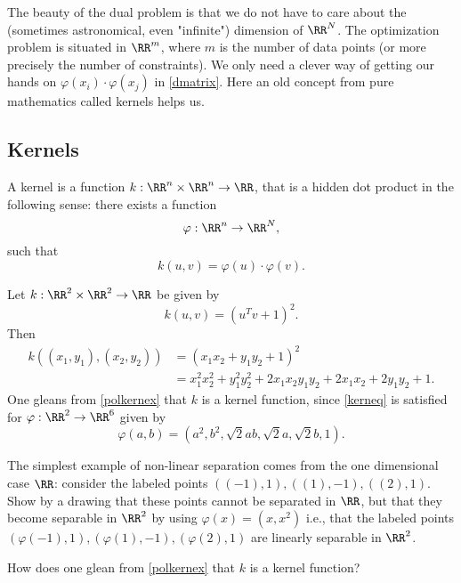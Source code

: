 \documentclass{article}
\begin{document}
    The beauty of the dual problem is that we do not have to care about the (sometimes astronomical, even
    "infinite") dimension of $\RR^N$. The optimization problem is situated in $\RR^m$, where
    $m$ is the number of data points (or more precisely the number of constraints). We only need a clever way of getting our hands on
    $\varphi(x_i)\cdot \varphi(x_j)$ in \eqref{dmatrix}. Here an old concept from
    pure mathematics called kernels helps us.
  

    
\subsection{Kernels}
  
  A kernel is a function
  $k: \RR^n\times \RR^n \rightarrow \RR$, that is a hidden dot product
  in the following sense: there exists a function
  $$
  \varphi: \RR^n\rightarrow \RR^N,
  $$
  such that
    \begin{equation}\label{kerneq}
  k(u, v) = \varphi(u)\cdot \varphi(v).
\end{equation}

  \begin{example}\label{ex:kernel2}
    Let $k:\RR^2 \times \RR^2 \rightarrow \RR$ be given by
    $$
    k(u, v) = (u^T v + 1)^2.
    $$
    Then
    \begin{align}\label{polkernex}
      k((x_1, y_1), (x_2, y_2)) &= (x_1 x_2 + y_1 y_2 +1)^2\\
      &= x_1^2 x_2^2 + y_1^2 y_2^2 + 2 x_1 x_2 y_1 y_2 + 2 x_1 x_2 + 2 y_1 y_2 + 1.
    \end{align}
    One gleans from \eqref{polkernex} that $k$ is a kernel function, since \eqref{kerneq} is
    satisfied for $\varphi: \RR^2\rightarrow \RR^6$ given by
    $$
    \varphi(a, b) = (a^2, b^2, \sqrt{2} a b, \sqrt{2} a, \sqrt{2} b, 1).
    $$
  \end{example}


  \beginshex
  The simplest example of non-linear separation comes from the one dimensional case $\RR$:
  consider the labeled points $((-1), 1), ((1), -1), ((2), 1)$. Show by a drawing
  that these points cannot be separated in $\RR$, but that they become separable
  in $\RR^2$ by using $\varphi(x) = (x, x^2)$ i.e., that the labeled points
  $(\varphi(-1), 1), (\varphi(1), -1), (\varphi(2), 1)$ are linearly separable
  in $\RR^2$.
  
  How does one glean from \eqref{polkernex} that $k$ is a kernel function?
  \endshex
  
\end{document}
